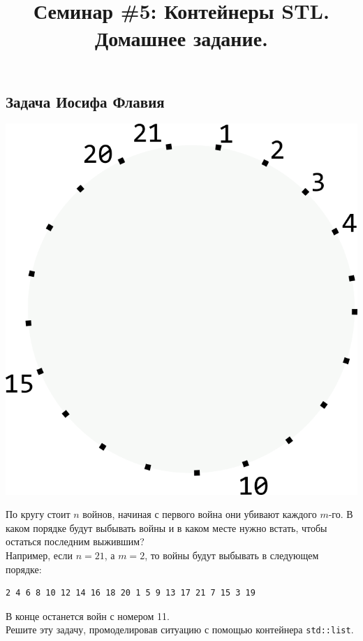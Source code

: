 \documentclass{article}
\begin{document}
\title{Семинар \#5: Контейнеры STL. Домашнее задание.\vspace{-5ex}}\date{}\maketitle

\subsection{Задача Иосифа Флавия}

\begin{multicols}{2}
\includegraphics[scale=1]{../images/josephus.png}

По кругу стоит $n$ войнов, начиная с первого война они убивают каждого $m$-го. В каком порядке будут выбывать войны и в каком месте нужно встать, чтобы остаться последним выжившим?\\

Например, если $n = 21$, а $m = 2$, то войны будут выбывать в следующем порядке:
\begin{verbatim}
2 4 6 8 10 12 14 16 18 20 1 5 9 13 17 21 7 15 3 19
\end{verbatim}
В конце останется войн с номером 11.\\

Решите эту задачу, промоделировав ситуацию с помощью контейнера \texttt{std::list}.
\end{multicols}
\end{document}
